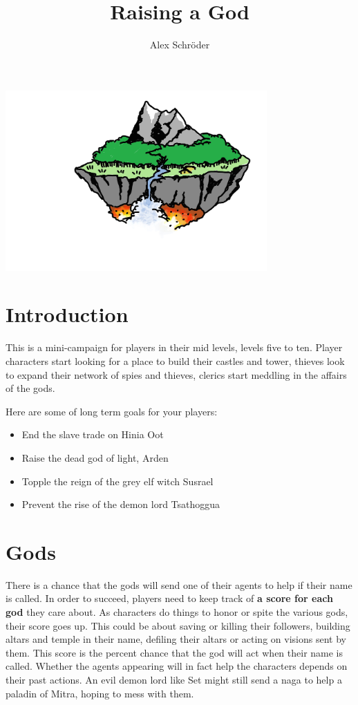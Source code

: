 \documentclass[11pt]{bxart}
\title{\textbf{Raising a God}}
\author{Alex Schröder}
\begin{document}
\begin{titlepage}
  \maketitle
  \centering
  \includegraphics[width=10cm]{Floating-Island.jpg}
  \tableofcontents
\end{titlepage} 

\section{Introduction}

This is a mini-campaign for players in their mid levels, levels five to ten. Player characters start looking for a place to build their castles and tower, thieves look to expand their network of spies and thieves, clerics start meddling in the affairs of the gods.

Here are some of long term goals for your players:

\begin{itemize}
\item End the slave trade on Hinia Oot
\item Raise the dead god of light, Arden
\item Topple the reign of the grey elf witch Susrael
\item Prevent the rise of the demon lord Tsathoggua
\end{itemize}

\section{Gods}

There is a chance that the gods will send one of their agents to help if their name is called. In order to succeed, players need to keep track of \textbf{a score for each god} they care about. As characters do things to honor or spite the various gods, their score goes up. This could be about saving or killing their followers, building altars and temple in their name, defiling their altars or acting on visions sent by them. This score is the percent chance that the god will act when their name is called. Whether the agents appearing will in fact help the characters depends on their past actions. An evil demon lord like Set might still send a naga to help a paladin of Mitra, hoping to mess with them.
\end{document}
